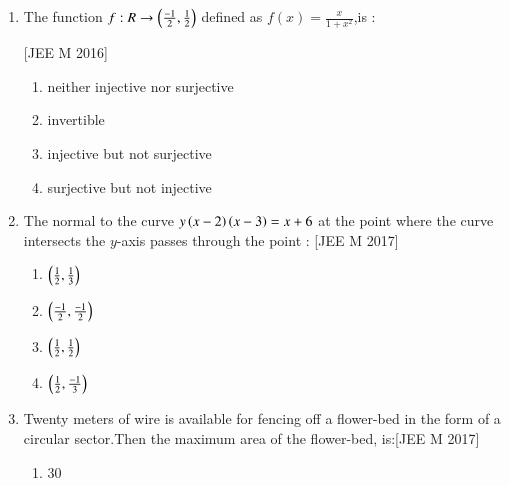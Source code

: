 \documentclass[journal,12pt,twocolumn]{IEEEtran}
\theoremstyle{remark}
\begin{document}
\begin{enumerate}
\hfill[JEE M 2016]\\
\begin{enumerate}
    \item  $x=2r$\\
    \item  $2x=r$\\
    \item  $2x=\brak{\pi+4r}$\\
    \item  $\brak{4-\pi}x=\pi r$\\
\end{enumerate}
\item The function $f : R\rightarrow {\ensuremath{\left(\frac{-1}{2},\frac{1}{2}\right)}}$ defined as $f(x)=\frac{x}{1+x^2}$,is :

\hfill[JEE M 2016]\\
\begin{enumerate}
    \item  neither injective nor surjective\\
    \item  invertible\\
    \item  injective but not surjective\\
    \item  surjective but not injective\\
\end{enumerate}
\item The normal to the curve $y\left(x-2\right)\left(x-3\right)=x+6$ at the point where the curve intersects the $y$-axis passes through the point : \hfill[JEE M 2017]
\begin{enumerate}
    \item  $\left(\frac{1}{2},\frac{1}{3}\right)$\\
    \item  $\left(\frac{-1}{2},\frac{-1}{2}\right)$\\
    \item  $\left(\frac{1}{2},\frac{1}{2}\right)$\\
    \item  $\left(\frac{1}{2},\frac{-1}{3}\right)$\\
\end{enumerate}
\item Twenty meters of wire is available for fencing off a flower-bed in the form of a circular sector.Then the maximum area of the flower-bed, is:\hfill[JEE M 2017]\\
\begin{enumerate}
    \item  30\\

\end{enumerate}
\end{enumerate}
\end{document}
